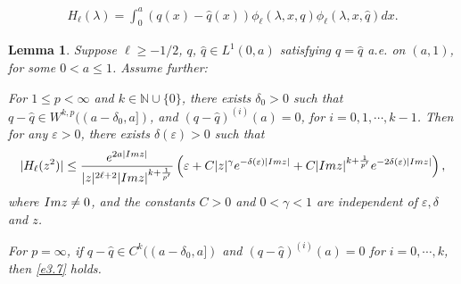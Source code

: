 \documentclass[10pt,a4paper]{amsart}
\newtheorem{lemma}{Lemma}
\begin{document}
\begin{align}\label{e3.1}
H_{\ell}(\lambda)
=\int_0^a(q(x)-\hat{q}(x))\phi_{\ell}(\lambda, x, q)\phi_{\ell}(\lambda, x, \hat{q})dx. 
\end{align}

\begin{lemma}\label{l3.6}
Suppose $\ell\geq-1/2$, $q$, $\hat{q}\in L^{1}(0, a)$ satisfying $q=\hat{q}$ a.e. on $(a, 1)$, for some $0<a\leq1$. Assume further: 

For $1\leq p<\infty$ and $k\in\mathbb{N}\cup\{0\}$, there exists $\delta_0>0$ such that $q-\hat{q}\in W^{k,p}((a-\delta_0, a])$, and
$(q-\hat{q})^{(i)}(a)=0$, for $i=0,1, \cdots, k-1$.
Then for any $\varepsilon>0$, there exists $\delta(\varepsilon)>0$ such that
\begin{equation}\label{e3.7}
|H_{\ell}(z^2)| 
\leq \frac{e^{2a|\textnormal{Im}z|}}
{|z|^{2\ell+2}|\textnormal{Im}z|^{k+\frac{1}{p^{\prime}}}}
\left(\varepsilon
+C|z|^{\gamma}e^{-\delta(\varepsilon)|\textnormal{Im}z|}
+C|\textnormal{Im}z|^{k+\frac{1}{p^{\prime}}}
e^{-2\delta(\varepsilon)|\textnormal{Im}z|}\right), 
\end{equation}
where $\textnormal{Im}z \neq 0$,
and the constants $C>0$ and $0<\gamma<1$ are independent of $\varepsilon, \delta$ and $z$.

For $p=\infty$, if $q-\hat{q} \in C^{k}((a-\delta_0, a])$ and $(q-\hat{q})^{(i)}(a)=0$ for $i=0, \cdots, k$, then \eqref{e3.7} holds.
\end{lemma}
\end{document}
